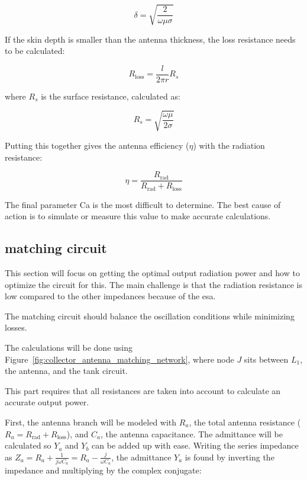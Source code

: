 \begin{equation}
	\delta = \sqrt{\frac{2}{\omega \mu \sigma}}
\end{equation}

If the skin depth is smaller than the antenna thickness, the loss resistance needs to be calculated:

\begin{equation}
	R_{\text{loss}} = \frac{l}{2\pi r} R_s
\end{equation}

where $R_s$ is the surface resistance, calculated as:

\begin{equation}
	R_s = \sqrt{\frac{\omega \mu}{2 \sigma}}
\end{equation}

Putting this together gives the antenna efficiency ($\eta$) with the radiation resistance:

\begin{equation}
	\eta = \frac{R_{\text{rad}}}{R_{\text{rad}} + R_{\text{loss}}}
\end{equation}

The final parameter Ca is the most difficult to determine. The best cause of action is to simulate or measure this value to make accurate calculations.

\subsection{matching circuit}

This section will focus on getting the optimal output radiation power and how to optimize the circuit for this. The main challenge is that the radiation resistance is low compared to the other impedances because of the \gls{esa}.

The matching circuit should balance the oscillation conditions while minimizing losses.

The calculations will be done using Figure~\ref{fig:collector_antenna_matching_network}, where node $J$ sits between $L_1$, the antenna, and the tank circuit.

This part requires that all resistances are taken into account to calculate an accurate output power. 

First, the antenna branch will be modeled with $R_a$, the total antenna resistance ($R_a = R_{\text{rad}} + R_{\text{loss}}$), and $C_a$, the antenna capacitance. The admittance will be calculated so $Y_a$ and $Y_b$ can be added up with ease. Writing the series impedance as $Z_a = R_a + \frac{1}{j\omega C_a} = R_a - \frac{j}{\omega C_a}$, the admittance $Y_a$ is found by inverting the impedance and multiplying by the complex conjugate:

